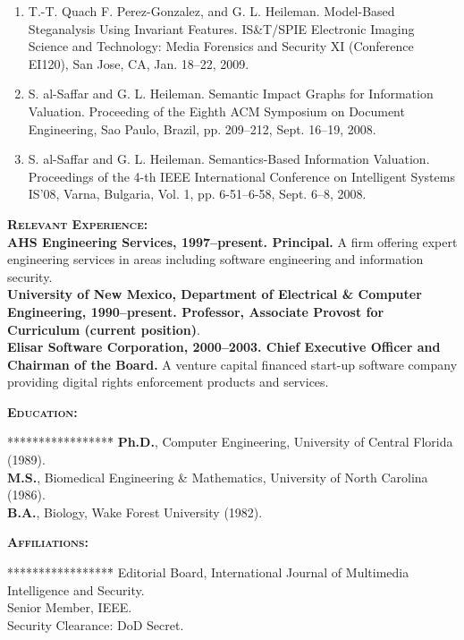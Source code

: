 \documentclass{sbir}
\begin{document}
{{\begin{enumerate}
\item T.-T. Quach F. Perez-Gonzalez, and G. L. Heileman. Model-Based Steganalysis Using Invariant Features. IS\&T/SPIE Electronic Imaging Science and Technology: Media Forensics and Security XI (Conference EI120), San Jose, CA, Jan. 18--22, 2009.

\item S. al-Saffar and G. L. Heileman. Semantic Impact Graphs for Information Valuation. Proceeding of the Eighth ACM Symposium on Document Engineering, Sao Paulo, Brazil, pp. 209--212, Sept. 16--19, 2008.

\item S. al-Saffar and G. L. Heileman. Semantics-Based Information Valuation. Proceedings of the 4-th IEEE International Conference on Intelligent Systems IS'08, Varna, Bulgaria, Vol. 1, pp. 6-51--6-58, Sept. 6--8, 2008.

\end{enumerate}

\vspace{-6pt}
\textbf{\textsc{Relevant Experience:}}~\\
{\bfseries AHS Engineering Services, 1997--present. Principal.} A firm offering expert engineering services in areas including software engineering and information security.~\\
{\bfseries University of New Mexico, Department of Electrical \& Computer Engineering, 1990--present. Professor, Associate Provost for Curriculum (current position)}.~\\
{\bfseries Elisar Software Corporation, 2000--2003. Chief Executive Officer and Chairman of the Board.} A venture capital financed start-up software company providing digital rights enforcement products and services.

\vspace{-6pt}
\textbf{\textsc{Education:}}
\vspace{-30pt}
\begin{tabbing}*****************\=\kill
 \> {\bfseries Ph.D.}, Computer Engineering, University of Central Florida (1989). \\
 \> {\bfseries M.S.}, Biomedical Engineering \& Mathematics, University of North Carolina (1986). \\
 \> {\bfseries B.A.}, Biology, Wake Forest University (1982).
\end{tabbing}

\vspace{-12pt}
\textbf{\textsc{Affiliations:}}
\vspace{-30pt}
\begin{tabbing}*****************\=\kill
\> Editorial Board,  International Journal of Multimedia Intelligence and Security. \\
\> Senior Member, IEEE. \\
\> Security Clearance: DoD Secret.
\end{tabbing}
\vspace{-12pt}

}}
\end{document}
